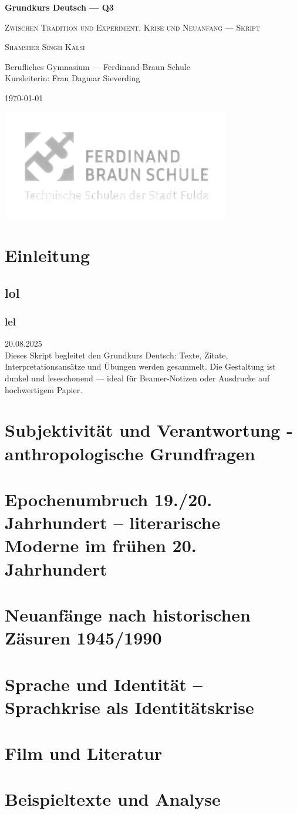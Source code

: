 \documentclass[11pt,a4paper,oneside]{article}
\newcommand{\lessondate}[1]{\noindent\hfill\textcolor{MarginalGray}{\textsc{#1}}\\\vspace{0.5cm}}
\newcommand{\MakeArtTitle}[4]{%
	\begin{titlepage}
		\centering
		\vspace*{24mm}
		{\sffamily\bfseries\huge #1 \par}
		\vspace{8mm}
		{\Large \scshape#2 \par}
		\vspace{16mm}
		{\large\scshape\color{TextCream} #3 \par}
		\vspace{6mm}
		{\small\color{MarginalGray} #4 \par}
		\vspace{8mm}
		{\small\color{MarginalGray}\today \par}
		\vfill
		\vspace{6cm}
		\centering
		\includegraphics[width=0.75\textwidth]{2.png} %
	\end{titlepage}
}
\begin{document}
	
	\MakeArtTitle
	{Grundkurs Deutsch — Q3}
	{Zwischen Tradition und Experiment, Krise und Neuanfang — Skript}
	{Shamsher Singh Kalsi}
	{Berufliches Gymnasium — Ferdinand-Braun Schule \\ Kursleiterin: Frau Dagmar Sieverding}
	
	\tableofcontents
	\clearpage
	
	\section{Einleitung}
	\subsection{lol}
	\subsubsection{lel}
	\lessondate{20.08.2025}
	Dieses Skript begleitet den Grundkurs Deutsch: Texte, Zitate, Interpretationsansätze und Übungen werden gesammelt. Die Gestaltung ist dunkel und leseschonend — ideal für Beamer-Notizen oder Ausdrucke auf hochwertigem Papier.
	
	
	\newpage
	
	\section{Subjektivität und Verantwortung - anthropologische Grundfragen}
	\section{Epochenumbruch 19./20. Jahrhundert – literarische Moderne im frühen 20. Jahrhundert}
	\section{Neuanfänge nach historischen Zäsuren 1945/1990}
	\section{Sprache und Identität – Sprachkrise als Identitätskrise}
	\section{Film und Literatur}
	
	\newpage
	
	\section{Beispieltexte und Analyse}
	
\end{document}
